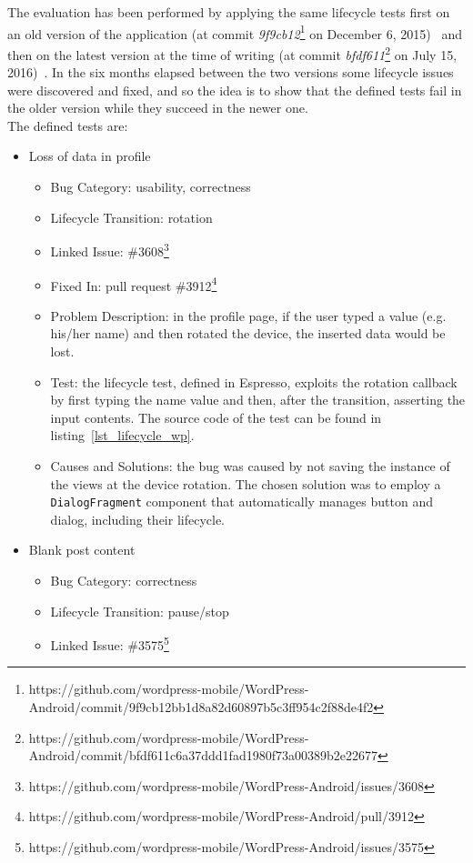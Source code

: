 \documentclass[11pt,a4paper,notitlepage]{article}
\begin{document}
The evaluation has been performed by applying the same lifecycle tests first on an old version of the application (at commit \textit{9f9cb12}\footnote{https://github.com/wordpress-mobile/WordPress-Android/commit/9f9cb12bb1d8a82d60897b5c3ff954c2f88de4f2} on December 6, 2015)~\cite{WordPress2015-12-06} and then on the latest version at the time of writing (at commit \textit{bfdf611}\footnote{https://github.com/wordpress-mobile/WordPress-Android/commit/bfdf611c6a37ddd1fad1980f73a00389b2e22677} on July 15, 2016)~\cite{WordPress2016-07-15}. In the six months elapsed between the two versions some lifecycle issues were discovered and fixed, and so the idea is to show that the defined tests fail in the older version while they succeed in the newer one.\bigskip \\
The defined tests are:
\begin{itemize}
	\item Loss of data in profile
	\begin{itemize}
		\item Bug Category: usability, correctness
		\item Lifecycle Transition: rotation
		\item Linked Issue: \#3608\footnote{https://github.com/wordpress-mobile/WordPress-Android/issues/3608}
		\item Fixed In: pull request \#3912\footnote{https://github.com/wordpress-mobile/WordPress-Android/pull/3912} 
		\item Problem Description: in the profile page, if the user typed a value (e.g. his/her name) and then rotated the device, the inserted data would be lost.
		\item Test: the lifecycle test, defined in Espresso, exploits the rotation callback by first typing the name value and then, after the transition, asserting the input contents. The source code of the test can be found in listing~\ref{lst_lifecycle_wp}.
		\item Causes and Solutions: the bug was caused by not saving the instance of the views at the device rotation. The chosen solution was to employ a \texttt{DialogFragment} component that automatically manages button and dialog, including their lifecycle.
	\end{itemize}
	\item Blank post content
	\begin{itemize}
		\item Bug Category: correctness
		\item Lifecycle Transition: pause/stop
		\item Linked Issue: \#3575\footnote{https://github.com/wordpress-mobile/WordPress-Android/issues/3575}

\end{itemize}
\end{itemize}
\end{document}
